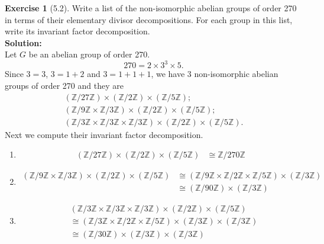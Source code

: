 \documentclass{amsart}
\newcommand{\bbz}{\mathbb{Z}}
\theoremstyle{plain}
\theoremstyle{definition}
\newtheorem{exer}[lem]{Exercise}
\begin{document}
\begin{exer}[5.2]
Write a list of the non-isomorphic abelian groups of order 270 in terms of their elementary divisor decompositions. 
For each group in this list, write its invariant factor decomposition. \\
\textbf{Solution:}\\
Let $G$ be an abelian group of order 270.
\[270 = 2 \times 3^3\times 5.\] 
Since $3=3$, $3=1+2$ and $3=1+1+1$,
we have 3 non-isomorphic abelian groups of order 270 and they are
\begin{gather*}
(\bbz/27\bbz) \times (\bbz/2\bbz) \times (\bbz/5\bbz);\\
\left( \bbz/9\bbz \times \bbz/3\bbz \right)\times (\bbz/2\bbz) \times (\bbz/5\bbz);\\
\left( \bbz/3\bbz \times \bbz/3\bbz \times \bbz/3\bbz \right)\times (\bbz/2\bbz) \times (\bbz/5\bbz).
\end{gather*}
Next we compute their invariant factor decomposition.
\begin{enumerate}[(1)]
	\item
	  \begin{align*}
	 	(\bbz/27\bbz) \times (\bbz/2\bbz) \times (\bbz/5\bbz) &\cong \bbz/270\bbz      		
	  \end{align*}
	\item
	  \begin{align*}
	  	\left( \bbz/9\bbz \times \bbz/3\bbz \right)\times (\bbz/2\bbz) \times (\bbz/5\bbz) &\cong  \left( \bbz/9\bbz \times \bbz/2\bbz \times \bbz/5\bbz \right)\times (\bbz/3\bbz) \\
	  			&\cong \left( \bbz/90\bbz \right)\times (\bbz/3\bbz)
	  \end{align*}
	\item
	\begin{align*}
	  &\left( \bbz/3\bbz \times \bbz/3\bbz \times \bbz/3\bbz \right)\times (\bbz/2\bbz) \times (\bbz/5\bbz) \\
	  &\cong  \left( \bbz/3\bbz \times \bbz/2\bbz \times \bbz/5\bbz \right) \times (\bbz/3\bbz) \times (\bbz/3\bbz)  \\
	  &\cong \left( \bbz/30\bbz \right)\times (\bbz/3\bbz) \times (\bbz/3\bbz) 
	\end{align*}
\end{enumerate}
\end{exer}
\end{document}
